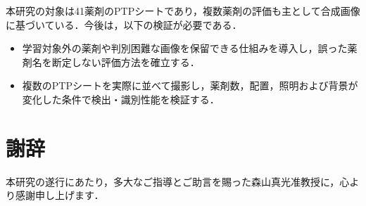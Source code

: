 \documentclass[dvipdfmx]{jsarticle}
\begin{document}
本研究の対象は41薬剤のPTPシートであり，複数薬剤の評価も主として合成画像に基づいている．今後は，以下の検証が必要である．

\begin{itemize}
  \item 学習対象外の薬剤や判別困難な画像を保留できる仕組みを導入し，誤った薬剤名を断定しない評価方法を確立する．
  \item 複数のPTPシートを実際に並べて撮影し，薬剤数，配置，照明および背景が変化した条件で検出・識別性能を検証する．
\end{itemize}

\newpage
\section*{謝辞}

本研究の遂行にあたり，多大なご指導とご助言を賜った森山真光准教授に，心より感謝申し上げます．

\newpage
\end{document}
